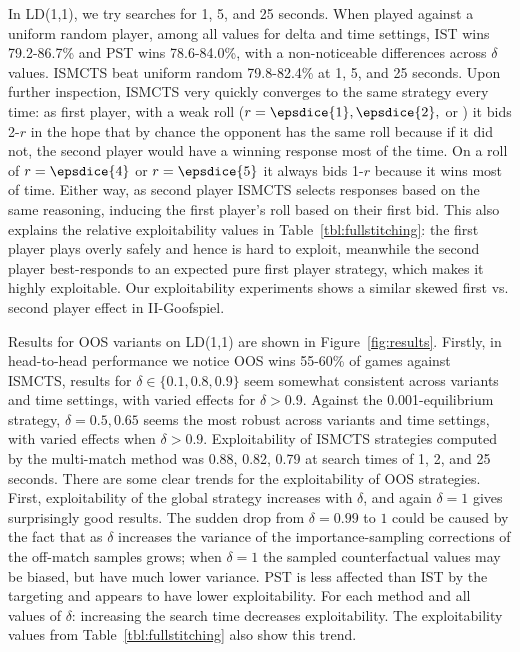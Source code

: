 \documentclass[letterpaper]{article}
\begin{document}
In LD(1,1), we try searches for 1, 5, and 25 seconds. 
When played against a uniform random player, among all values for delta and time settings, 
IST wins 79.2-86.7\% and PST wins 78.6-84.0\%, with a non-noticeable differences across $\delta$ values. 
ISMCTS beat uniform random 79.8-82.4\% at 1, 5, and 25 seconds. 
Upon further inspection, ISMCTS very quickly converges to the same strategy every time: as first player, 
with a weak roll ($r = \epsdice{1}, \epsdice{2},$ or ) it bids 2-$r$ in the hope that by chance the
opponent has the same roll because if it did not, the second player would have a winning response most of the time.
On a roll of $r = \epsdice{4}$ or $r = \epsdice{5}$ it always bids 1-$r$ because it wins most of time. Either way, as 
second player ISMCTS selects responses based on the same reasoning, inducing the first player's roll based on their
first bid. This also explains the relative exploitability values in Table~\ref{tbl:fullstitching}: the first player
plays overly safely and hence is hard to exploit, meanwhile the second player best-responds to an expected pure first 
player strategy, which makes it highly exploitable. 
Our exploitability experiments shows a similar skewed first vs. second player effect in II-Goofspiel. 

Results for OOS variants on LD(1,1) are shown in Figure~\ref{fig:results}. Firstly, in head-to-head performance 
we notice OOS wins 55-60\% of games against ISMCTS, results for $\delta \in \{ 0.1, 0.8, 0.9 \}$ seem somewhat 
consistent across variants and time settings, with varied effects for $\delta > 0.9$. 
Against the 0.001-equilibrium strategy, 
$\delta = 0.5, 0.65$ seems the most robust across variants and time settings, with varied effects when $\delta > 0.9$.
Exploitability of ISMCTS strategies computed by the multi-match method was 0.88, 0.82, 0.79 at search times of 
1, 2, and 25 seconds. There are some clear trends for the exploitability of OOS strategies. 
First, exploitability of the global strategy 
increases with $\delta$, and again $\delta = 1$ gives surprisingly good results. 
The sudden drop from $\delta = 0.99$ to $1$ could be caused by the fact that as $\delta$ increases the 
variance of the importance-sampling corrections of the off-match samples grows; when $\delta = 1$ the 
sampled counterfactual values may be biased, but have much lower variance. 
PST is less affected than IST by the targeting and appears to have lower exploitability. 
For each method and all values of $\delta$: increasing the search time decreases exploitability. 
The exploitability values from Table~\ref{tbl:fullstitching} also show this trend. 
\end{document}
